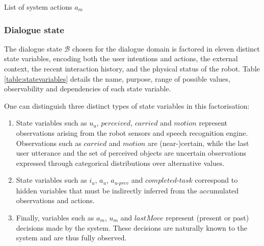\begin{table}[p!]
\begin{footnotesize}
\end{footnotesize}
 \caption{List of system actions $a_m$} 
\label{table:systemdas_exp3}
\end{table}

\subsubsection*{Dialogue state}

The dialogue state $\mathcal{B}$ chosen for the dialogue domain is factored in eleven distinct state variables, encoding both the user intentions and actions, the external context, the recent interaction history, and the physical status of the robot. Table \ref{table:statevariables} details the name, purpose, range of possible values, observability and dependencies of each state variable. 

One can distinguish three distinct types of state variables in this factorisation:
\begin{enumerate}
\item State variables such as $u_u$, $\mathit{perceived}$, $\mathit{carried}$ and $\mathit{motion}$ represent observations arising from the robot sensors and speech recognition engine. Observations such as $\mathit{carried}$ and $\mathit{motion}$ are (near-)certain, while the last user utterance and the set of perceived objects are uncertain observations expressed through categorical distributions over alternative values. 
\item State variables such as $i_u$, $a_u$, $a_{u\mbox{-}prev}$ and $\mathit{completed\mbox{-}task}$ correspond to hidden variables that must be indirectly inferred from the accumulated observations and actions.
\item Finally, variables such as $a_m$, $u_m$ and $\mathit{lastMove}$ represent (present or past) decisions made by the system. These decisions are naturally known to the system and are thus fully observed. 
\end{enumerate}

